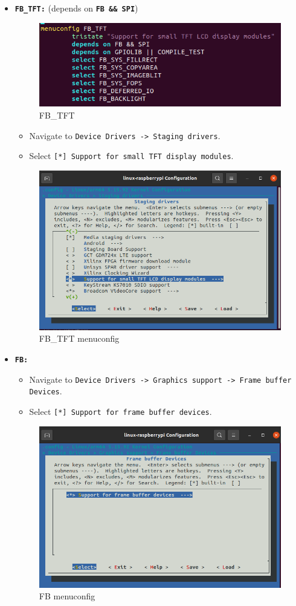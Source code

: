 \documentclass{article}
\begin{document}
\begin{itemize}
\begin{itemize}
\begin{itemize}
            \item \texttt{\textbf{FB\_TFT:}} (depends on \texttt{\textbf{FB \&\& SPI}})
            \begin{figure}[H]
                \centering
                \includegraphics[width=0.5\linewidth]{FB_TFT.png}
                \caption{FB\_TFT}
                \label{fig:fb_tft}
            \end{figure}
            \begin{itemize}
                \item Navigate to \texttt{Device Drivers -> Staging drivers}.
                \item Select \texttt{[*] Support for small TFT display modules}.
            \end{itemize}
            \begin{figure}[H]
                \centering
                \includegraphics[width=0.5\linewidth]{FB_TFT_menuconfig.png}
                \caption{FB\_TFT menuconfig}
                \label{fig:fb_tft_menuconfig}
            \end{figure}
            
            \item \texttt{\textbf{FB:}}
            \begin{itemize}
                \item Navigate to \texttt{Device Drivers -> Graphics support -> Frame buffer Devices}.
                \item Select \texttt{[*] Support for frame buffer devices}.
            \end{itemize}
            \begin{figure}[H]
                \centering
                \includegraphics[width=0.5\linewidth]{FB_menuconfig.png}
                \caption{FB menuconfig}
                \label{fig:fb_menuconfig}
            \end{figure}
            

\end{itemize}
\end{itemize}
\end{itemize}
\end{document}
